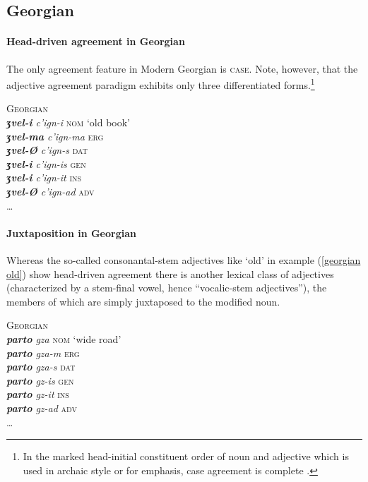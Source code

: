 \subsection{Georgian}\label{georgian synchr}
\paragraph{Head-driven agreement in Georgian}
The only agreement feature in Modern Georgian is \textsc{case}. Note, however, that the adjective agreement paradigm exhibits only three differentiated forms.\footnote{In the marked head-initial constituent order of noun and adjective which is used in archaic style or for emphasis, case agreement is complete \citep[59]{tuite1998}.}
\begin{exe}
\ex \textsc{Georgian} \cite[236]{aronson1991}\\
\textit{\textbf{ʒvel-i} c'ign-i} \textsc{nom} ‘old book’\\
\textit{\textbf{ʒvel-ma} c'ign-ma} \textsc{erg}\\
\textit{\textbf{ʒvel-Ø} c'ign-s} \textsc{dat}\\
\textit{\textbf{ʒvel-i} c'ign-is} \textsc{gen}\\
\textit{\textbf{ʒvel-i} c'ign-it} \textsc{ins}\\
\textit{\textbf{ʒvel-Ø} c'ign-ad} \textsc{adv}\\
\dots \label{georgian old}
\end{exe}

\paragraph{Juxtaposition in Georgian}
Whereas the so-called consonantal-stem adjectives like ‘old’ in example (\ref{georgian old}) show head-driven agreement there is another lexical class of adjectives (characterized by a stem-final vowel, hence “vocalic-stem adjectives”), the members of which are simply juxtaposed to the modified noun.
\begin{exe}
\ex \textsc{Georgian} \cite[236]{aronson1991}\\
\textit{\textbf{parto} gza} \textsc{nom} ‘wide road’\\
\textit{\textbf{parto} gza-m} \textsc{erg}\\
\textit{\textbf{parto} gza-s} \textsc{dat}\\
\textit{\textbf{parto} gz-is} \textsc{gen}\\
\textit{\textbf{parto} gz-it} \textsc{ins}\\
\textit{\textbf{parto} gz-ad} \textsc{adv}\\
\dots
\end{exe}

